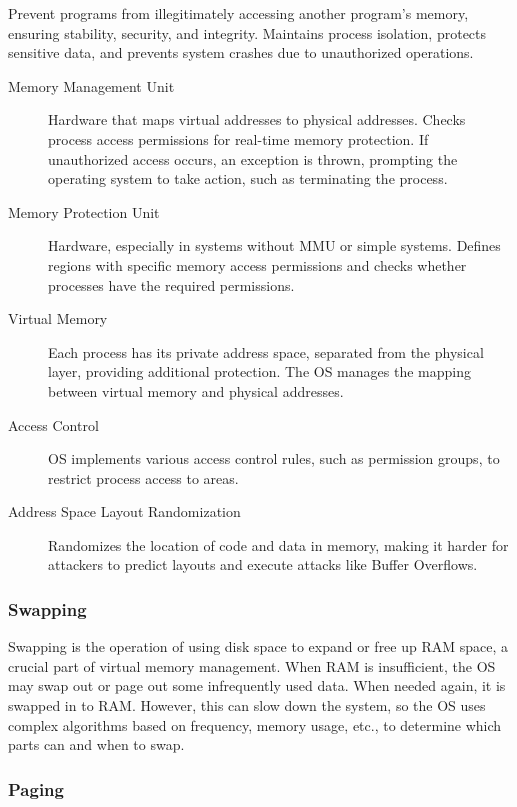 \documentclass[11pt,journal,compsoc]{IEEEtran}
\begin{document}
Prevent programs from illegitimately accessing another program's memory, ensuring stability, security, and integrity. Maintains process isolation, protects sensitive data, and prevents system crashes due to unauthorized operations.

\begin{description}
    \item[Memory Management Unit] Hardware that maps virtual addresses to physical addresses. Checks process access permissions for real-time memory protection. If unauthorized access occurs, an exception is thrown, prompting the operating system to take action, such as terminating the process.
    
    \item[Memory Protection Unit] Hardware, especially in systems without MMU or simple systems. Defines regions with specific memory access permissions and checks whether processes have the required permissions.
    
    \item[Virtual Memory] Each process has its private address space, separated from the physical layer, providing additional protection. The OS manages the mapping between virtual memory and physical addresses.
    
    \item[Access Control] OS implements various access control rules, such as permission groups, to restrict process access to areas.
    
    \item[Address Space Layout Randomization] Randomizes the location of code and data in memory, making it harder for attackers to predict layouts and execute attacks like Buffer Overflows.
\end{description}


\subsubsection{Swapping}

Swapping is the operation of using disk space to expand or free up RAM space, a crucial part of virtual memory management. When RAM is insufficient, the OS may swap out or page out some infrequently used data. When needed again, it is swapped in to RAM. However, this can slow down the system, so the OS uses complex algorithms based on frequency, memory usage, etc., to determine which parts can and when to swap.

\subsubsection{Paging}
\end{document}
